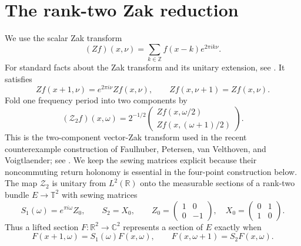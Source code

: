 \documentclass[11pt]{amsart}
\theoremstyle{remark}
\newcommand{\R}{\mathbb R}
\newcommand{\C}{\mathbb C}
\newcommand{\Z}{\mathbb Z}
\newcommand{\T}{\mathbb T}
\newcommand{\cZ}{\mathcal Z_2}
\begin{document}
\section{The rank-two Zak reduction}\label{sec:zak}

We use the scalar Zak transform
\begin{equation}\label{eq:zak}
 (Zf)(x,\nu)=\sum_{k\in\Z}f(x-k)e^{2\pi i k\nu}.
\end{equation}
For standard facts about the Zak transform and its unitary extension, see
\cite[Chapter~8, pp.~147--174]{Grochenig01}.  It satisfies
\begin{equation}\label{eq:zak-seams}
 Zf(x+1,\nu)=e^{2\pi i\nu}Zf(x,\nu),
 \qquad
 Zf(x,\nu+1)=Zf(x,\nu).
\end{equation}
Fold one frequency period into two components by
\begin{equation}\label{eq:vector-zak}
 (\cZ f)(x,\omega)=2^{-1/2}
 \begin{pmatrix}
  Zf(x,\omega/2)\\
  Zf(x,(\omega+1)/2)
 \end{pmatrix}.
\end{equation}
This is the two-component vector-Zak transform used in the recent
counterexample construction of Faulhuber, Petersen, van Velthoven, and
Voigtlaender; see \cite[Section~3.2]{FPVV26}.  We keep the sewing matrices
explicit because their noncommuting return holonomy is essential in the
four-point construction below.  The map $\cZ$ is unitary from $L^2(\R)$
onto the measurable sections of a rank-two bundle $E\to\T^2$ with sewing
matrices
\begin{equation}\label{eq:seams}
 S_1(\omega)=e^{\pi i\omega}Z_0,
 \qquad
 S_2=X_0,
 \qquad
 Z_0=\begin{pmatrix}1&0\\0&-1\end{pmatrix},
 \quad
 X_0=\begin{pmatrix}0&1\\1&0\end{pmatrix}.
\end{equation}
Thus a lifted section $F:\R^2\to\C^2$ represents a section of $E$ exactly
when
\begin{equation}\label{eq:section-seams}
 F(x+1,\omega)=S_1(\omega)F(x,\omega),
 \qquad
 F(x,\omega+1)=S_2F(x,\omega).
\end{equation}
\end{document}
